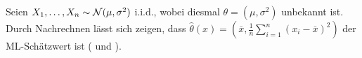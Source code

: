 \begin{Bsp}
    Seien $X_1, \dotsc, X_n \sim \mathcal{N}(\mu, \sigma^2)$ i.i.d., wobei diesmal
    $\theta = (\mu, \sigma^2)$ unbekannt ist.
    Durch Nachrechnen lässt sich zeigen, dass
    $\widehat{\theta}(x) = \left(\overline{x},
    \frac{1}{n} \sum_{i=1}^n (x_i - \overline{x})^2\right)$ der ML-Schätzwert ist
    ( und ).
\end{Bsp}

\pagebreak
